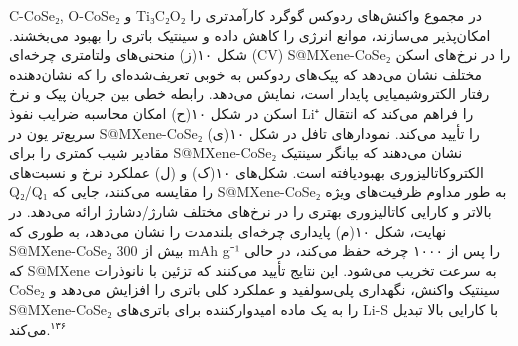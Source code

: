 \documentclass[12pt,a4paper,twocolumn]{article} %
\newcommand{\persian}[1]{\textfarsi{#1}}
\newcommand{\english}[1]{\textenglish{#1}}
\begin{document}
\persian{
\english{C-CoSe₂}, \english{O-CoSe₂} و \english{Ti₃C₂O₂} در مجموع واکنش‌های ردوکس گوگرد کارآمدتری را امکان‌پذیر می‌سازند، موانع انرژی را کاهش داده و سینتیک باتری را بهبود می‌بخشند. شکل ۱۰(ز) منحنی‌های ولتامتری چرخه‌ای (\english{CV}) \english{S@MXene-CoSe₂} را در نرخ‌های اسکن مختلف نشان می‌دهد که پیک‌های ردوکس به خوبی تعریف‌شده‌ای را که نشان‌دهنده رفتار الکتروشیمیایی پایدار است، نمایش می‌دهد. رابطه خطی بین جریان پیک و نرخ اسکن در شکل ۱۰(ح) امکان محاسبه ضرایب نفوذ \english{Li⁺} را فراهم می‌کند که انتقال سریع‌تر یون در \english{S@MXene-CoSe₂} را تأیید می‌کند. نمودارهای تافل در شکل ۱۰(ی) مقادیر شیب کمتری را برای \english{S@MXene-CoSe₂} نشان می‌دهند که بیانگر سینتیک الکتروکاتالیزوری بهبودیافته است. شکل‌های ۱۰(ک) و (ل) عملکرد نرخ و نسبت‌های \english{Q₂/Q₁} را مقایسه می‌کنند، جایی که \english{S@MXene-CoSe₂} به طور مداوم ظرفیت‌های ویژه بالاتر و کارایی کاتالیزوری بهتری را در نرخ‌های مختلف شارژ/دشارژ ارائه می‌دهد. در نهایت، شکل ۱۰(م) پایداری چرخه‌ای بلندمدت را نشان می‌دهد، به طوری که \english{S@MXene-CoSe₂} بیش از \english{300 mAh g⁻¹} را پس از ۱۰۰۰ چرخه حفظ می‌کند، در حالی که \english{S@MXene} به سرعت تخریب می‌شود. این نتایج تأیید می‌کنند که تزئین با نانوذرات \english{CoSe₂} سینتیک واکنش، نگهداری پلی‌سولفید و عملکرد کلی باتری را افزایش می‌دهد و \english{S@MXene-CoSe₂} را به یک ماده امیدوارکننده برای باتری‌های \english{Li-S} با کارایی بالا تبدیل می‌کند.$^{۱۳۶}$
}
\end{document}
